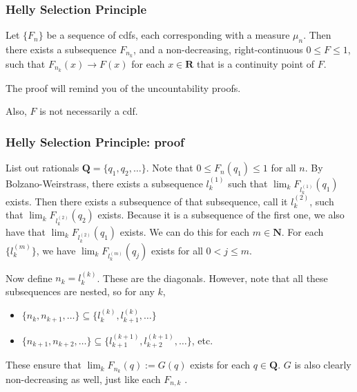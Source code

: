 \documentclass[handout]{beamer}
\begin{document}
%



\frame
{
\frametitle{Helly Selection Principle} 

\begin{Theorem} 
Let $\{F_n\}$ be a sequence of cdfs, each corresponding with a measure $\mu_n$. Then there exists a subsequence $F_{n_k}$, and a non-decreasing, right-continuous $0 \le F \le 1$, such that $F_{n_k}(x) \to F(x)$ for each $x \in \mathbf{R}$ that is a continuity point of $F$.
\end{Theorem}

The proof will remind you of the uncountability proofs. 
\newline

Also, $F$ is not necessarily a cdf.
}

\frame
{
\frametitle{Helly Selection Principle: proof} 

List out rationals $\mathbf{Q} = \{q_1, q_2,\ldots\}$. Note that $0 \le F_n(q_1) \le 1$ for all $n$. By Bolzano-Weirstrass, there exists a subsequence $l_k^{(1)}$ such that $\lim_k F_{l_k^{(1)} }(q_1)$ exists. Then there exists a subsequence of that subsequence, call it $l_k^{(2)}$, such that $\lim_k F_{l_k^{(2)} }(q_2)$ exists. Because it is a subsequence of the first one, we also have that $\lim_k F_{l_k^{(2)} }(q_1)$ exists. We can do this for each $m \in \mathbf{N}$. For each $\{l_{k}^{(m)} \}$, we have $\lim_k F_{l_k^{(m)} }(q_j)$ exists for all $0 < j \le m$.
\newline

Now define $n_k = l_k^{(k)}$. These are the diagonals. However, note that all these subsequences are nested, so for any $k$, 
\begin{itemize}
\item $\{n_k, n_{k+1}, \ldots\} \subseteq \{l^{(k)}_{k}, l^{(k)}_{k+1},\ldots\}  $ 
\item $\{n_{k+1}, n_{k+2}, \ldots\} \subseteq \{l^{(k+1)}_{k+1}, l^{(k+1)}_{k+2},\ldots\}  $, etc. 
\end{itemize}

These ensure that $\lim_k F_{n_k}(q) := G(q)$ exists for each $q \in \mathbf{Q}$. $G$ is also clearly non-decreasing as well, just like each $F_{n,k}$ .

}
\end{document}
